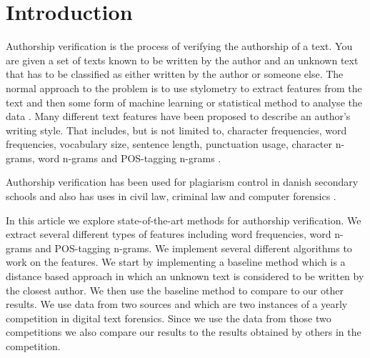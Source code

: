 \section{Introduction} \label{sec:introduction}
Authorship verification is the process of verifying the authorship of a text.
You are given a set of texts known to be written by the author and an unknown
text that has to be classified as either written by the author or someone else.
The normal approach to the problem is to use stylometry to extract features from
the text and then some form of machine learning or statistical method to analyse
the data \cite{stamatos2009}. Many different text features have been proposed
to describe an author's writing style. That includes, but is not limited to,
character frequencies, word frequencies, vocabulary size, sentence length,
punctuation usage, character n-grams, word n-grams and \gls{POS}-tagging n-grams
\cite{stamatos2009}.

Authorship verification has been used for plagiarism control in danish secondary
schools \cite{hansen2014} and also has uses in civil law, criminal law and
computer forensics \cite{stamatos2009}.

In this article we explore state-of-the-art methods for authorship verification.
We extract several different types of features including word frequencies, word
n-grams and \gls{POS}-tagging n-grams. We implement several different algorithms
to work on the features. We start by implementing a baseline method which is a
distance based approach in which an unknown text is considered to be written
by the closest author. We then use the baseline method to compare to our other
results. We use data from two sources \cite{pan:2015} and \cite{pan:2013} which
are two instances of a yearly competition in digital text forensics. Since we
use the data from those two competitions we also compare our results to the
results obtained by others in the competition.

